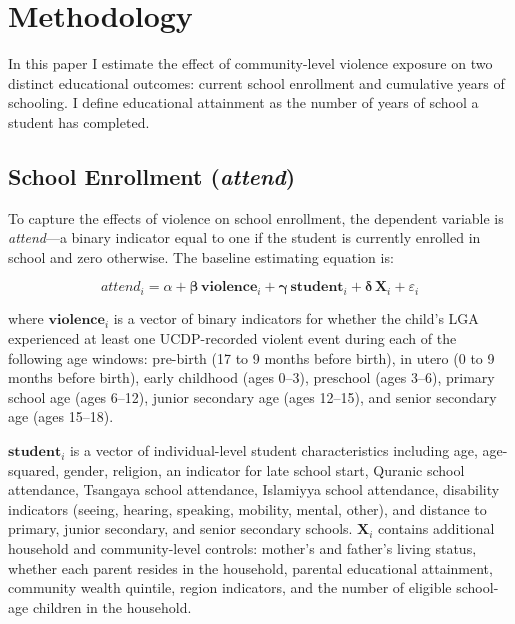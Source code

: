 
\section{Methodology}
\label{sec:methodology}

In this paper I estimate the effect of community-level violence exposure on
two distinct educational outcomes: current school enrollment and cumulative
years of schooling. I define educational attainment as the number of years
of school a student has completed.

\subsection{School Enrollment (\textit{attend})}
\label{sec:method_attend}

To capture the effects of violence on school enrollment, the dependent
variable is \textit{attend}---a binary indicator equal to one if the student
is currently enrolled in school and zero otherwise. The baseline estimating
equation is:

\begin{equation}
    \label{eq:attend}
    \textit{attend}_{i} = \alpha + \boldsymbol{\beta}\,\mathbf{violence}_{i}
        + \boldsymbol{\gamma}\,\mathbf{student}_{i}
        + \boldsymbol{\delta}\,\mathbf{X}_{i}
        + \varepsilon_{i}
\end{equation}

\noindent where $\mathbf{violence}_{i}$ is a vector of binary indicators for whether
the child's LGA experienced at least one UCDP-recorded violent event during
each of the following age windows: pre-birth (17 to 9 months before birth),
in utero (0 to 9 months before birth), early childhood (ages 0--3), preschool
(ages 3--6), primary school age (ages 6--12), junior secondary age (ages
12--15), and senior secondary age (ages 15--18).

$\mathbf{student}_{i}$ is a vector of individual-level student
characteristics including age, age-squared, gender, religion, an indicator
for late school start, Quranic school attendance, Tsangaya school
attendance, Islamiyya school attendance, disability indicators (seeing,
hearing, speaking, mobility, mental, other), and distance to primary,
junior secondary, and senior secondary schools. $\mathbf{X}_{i}$ contains
additional household and community-level controls: mother's and father's
living status, whether each parent resides in the household, parental
educational attainment, community wealth quintile, region indicators, and
the number of eligible school-age children in the household.

